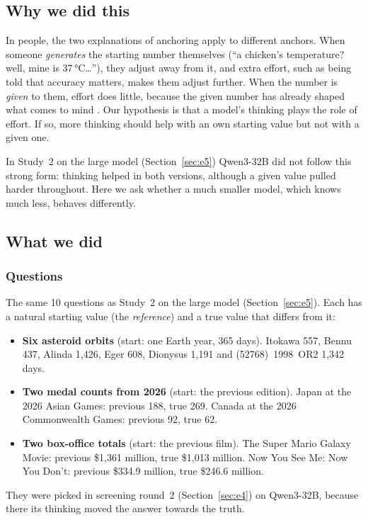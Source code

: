 \documentclass[11pt,a4paper]{article}
\begin{document}
\subsection{Why we did this}

In people, the two explanations of anchoring apply to different anchors. When someone \emph{generates} the starting number themselves (\enquote{a chicken's temperature? well, mine is 37\,°C\dots}), they adjust away from it, and extra effort, such as being told that accuracy matters, makes them adjust further. When the number is \emph{given} to them, effort does little, because the given number has already shaped what comes to mind \citep{epley2001putting,epley2005effortful}. Our hypothesis is that a model's thinking plays the role of effort. If so, more thinking should help with an own starting value but not with a given one.

In Study~2 on the large model (Section~\ref{sec:e5}) Qwen3-32B did not follow this strong form: thinking helped in both versions, although a given value pulled harder throughout. Here we ask whether a much smaller model, which knows much less, behaves differently.

\subsection{What we did}

\subsubsection{Questions}
The same 10 questions as Study~2 on the large model (Section~\ref{sec:e5}). Each has a natural starting value (the \emph{reference}) and a true value that differs from it:
\begin{itemize}[leftmargin=*]
  \item \textbf{Six asteroid orbits} (start: one Earth year, 365 days). Itokawa 557, Bennu 437, Alinda 1,426, Eger 608, Dionysus 1,191 and (52768)~1998~OR2 1,342 days.
  \item \textbf{Two medal counts from 2026} (start: the previous edition). Japan at the 2026 Asian Games: previous 188, true 269. Canada at the 2026 Commonwealth Games: previous 92, true 62.
  \item \textbf{Two box-office totals} (start: the previous film). The Super Mario Galaxy Movie: previous \$1,361 million, true \$1,013 million. Now You See Me: Now You Don't: previous \$334.9 million, true \$246.6 million.
\end{itemize}
They were picked in screening round~2 (Section~\ref{sec:e4}) on Qwen3-32B, because there its thinking moved the answer towards the truth.
\end{document}
